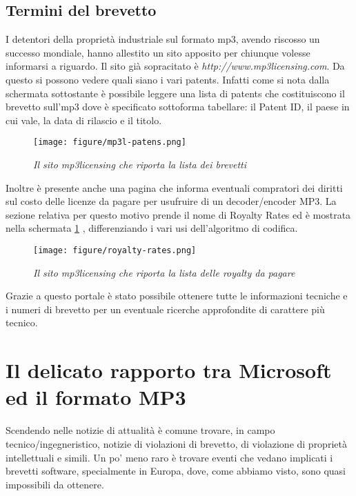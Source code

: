 \subsection{Termini del brevetto}
I detentori della proprietà industriale sul formato mp3, avendo riscosso un successo mondiale, hanno allestito un sito apposito per chiunque volesse informarsi a riguardo. Il sito già sopracitato è \textit{http://www.mp3licensing.com}. Da questo si possono vedere quali siano i vari patents. Infatti come si nota dalla schermata sottostante è possibile leggere una lista di patents che costituiscono il brevetto sull'mp3 dove è specificato sottoforma tabellare: il Patent ID, il paese in cui vale, la data di rilascio e il titolo.
\begin{figure}[h]
	\begin{center}
		\texttt{[image: figure/mp3l-patens.png]}
	\end{center}
	\caption{\textit{Il sito mp3licensing che riporta la lista dei brevetti}}
\end{figure}


Inoltre è presente anche una pagina che informa eventuali compratori dei diritti sul costo delle licenze da pagare per usufruire di un decoder/encoder MP3. La sezione relativa per questo motivo prende il nome di Royalty Rates ed è mostrata nella schermata \ref{fig:rr} , differenziando i vari usi dell'algoritmo di codifica.

\begin{figure}[h] \label{fig:rr}
	\begin{center}
		\texttt{[image: figure/royalty-rates.png]}
	\end{center}
	\caption{\textit{Il sito mp3licensing che riporta la lista delle royalty da pagare}}
\end{figure}


Grazie a questo portale è stato possibile ottenere tutte le informazioni tecniche e i numeri di brevetto per un eventuale ricerche approfondite di carattere più tecnico.


\section{Il delicato rapporto tra Microsoft ed il formato MP3}
Scendendo nelle notizie di attualità è comune trovare, in campo tecnico/ingegneristico, notizie di violazioni di brevetto, di violazione di proprietà intellettuali e simili. Un po' meno raro è trovare eventi che vedano implicati i brevetti software, specialmente in Europa, dove, come abbiamo visto, sono quasi impossibili da ottenere. 

